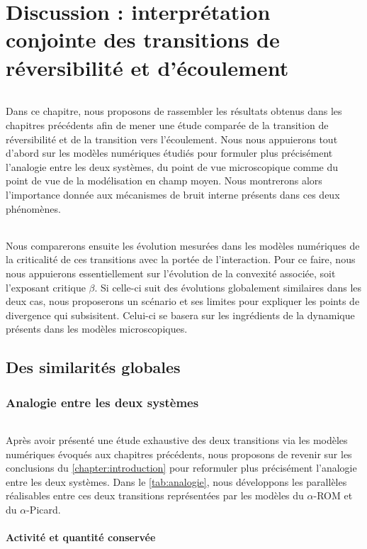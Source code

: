 \chapter{Discussion : interprétation conjointe des transitions de réversibilité et d'écoulement}

\label{chapter:discussion}

\subparagraph{}Dans ce chapitre, nous proposons de rassembler les résultats obtenus dans les chapitres précédents afin de mener une étude comparée de la transition de réversibilité et de la transition vers l'écoulement. Nous nous appuierons tout d'abord sur les modèles numériques étudiés pour formuler plus précisément l'analogie entre les deux systèmes, du point de vue microscopique comme du point de vue de la modélisation en champ moyen. Nous montrerons alors l'importance donnée aux mécanismes de bruit interne présents dans ces deux phénomènes.

\subparagraph{}Nous comparerons ensuite les évolution mesurées dans les modèles numériques de la criticalité de ces transitions avec la portée de l'interaction. Pour ce faire, nous nous appuierons essentiellement sur l'évolution de la convexité associée, soit l'exposant critique $\beta$. Si celle-ci suit des évolutions globalement similaires dans les deux cas, nous proposerons un scénario et ses limites pour expliquer les points de divergence qui subsisitent. Celui-ci se basera sur les ingrédients de la dynamique présents dans les modèles microscopiques.

\section{Des similarités globales}

\subsection{Analogie entre les deux systèmes}

\subparagraph{}Après avoir présenté une étude exhaustive des deux transitions via les modèles numériques évoqués aux chapitres précédents, nous proposons de revenir sur les conclusions du \autoref{chapter:introduction} pour reformuler plus précisément l'analogie entre les deux systèmes. Dans le \autoref{tab:analogie}, nous développons les parallèles réalisables entre ces deux transitions représentées par les modèles du $\alpha$-ROM et du $\alpha$-Picard.

\subsubsection{Activité et quantité conservée}

